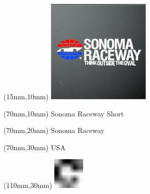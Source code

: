 \null\newpage
\begin{textblock*}{50mm}(15mm,10mm)%
\includegraphics[width=50mm]{LG/2015-05-20_00096.png}
\end{textblock*}
\begin{textblock*}{130mm}(70mm,10mm)%
{\fontsize{20}{20}\selectfont Sonoma Raceway Short}\\
\end{textblock*}
\begin{textblock*}{120mm}(70mm,20mm)%
{\fontsize{16}{16}\selectfont Sonoma Raceway}\\
\end{textblock*}
\begin{textblock*}{120mm}(70mm,30mm)%
{\fontsize{12}{12}\selectfont USA}
\end{textblock*}
\begin{textblock*}{30mm}(110mm,30mm)%
\centering
\includegraphics[height=15mm]{icons/fa-rotate-right.pdf}
\end{textblock*}
